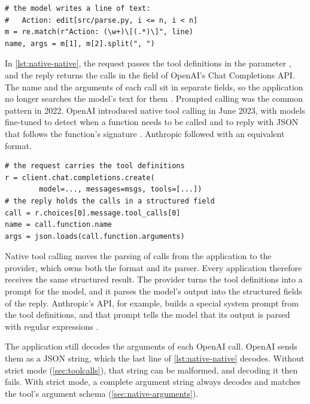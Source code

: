 \begin{lstlisting}[basicstyle=\ttfamily\footnotesize, caption={Illustrative code for prompted calling. The application finds the call in the model's text and splits the arguments at each comma followed by a space.}, label=lst:native-prompted]
# the model writes a line of text:
#   Action: edit[src/parse.py, i <= n, i < n]
m = re.match(r"Action: (\w+)\[(.*)\]", line)
name, args = m[1], m[2].split(", ")
\end{lstlisting}

In \cref{lst:native-native}, the request passes the tool definitions in the parameter
, and the reply returns the calls in the field  of OpenAI's Chat
Completions API. The name and the arguments of each call sit in separate fields, so the application
no longer searches the model's text for them \citep{openai-function-calling}. Prompted calling was
the common pattern in 2022. OpenAI introduced native tool calling in June 2023, with models fine-tuned to
detect when a function needs to be called and to reply with JSON that follows the function's
signature \citep{openai2023functioncalling}. Anthropic followed with an equivalent format.

\begin{lstlisting}[basicstyle=\ttfamily\footnotesize, caption={Illustrative code for native tool calling, abbreviated from OpenAI's Python client. The request carries the tool definitions, and the reply holds each call in a structured field.}, label=lst:native-native]
# the request carries the tool definitions
r = client.chat.completions.create(
        model=..., messages=msgs, tools=[...])
# the reply holds the calls in a structured field
call = r.choices[0].message.tool_calls[0]
name = call.function.name
args = json.loads(call.function.arguments)
\end{lstlisting}

Native tool calling moves the parsing of calls from the application to the provider, which owns both the
format and its parser. Every application therefore receives the same structured result. The
provider turns the tool definitions into a prompt for the model, and it parses the model's output
into the structured fields of the reply. Anthropic's API, for example, builds a special system
prompt from the tool definitions, and that prompt tells the model that its output is parsed with
regular expressions \citep{anthropic-define-tools}.

The application still decodes the arguments of each OpenAI call. OpenAI sends them as a JSON string,
which the last line of \cref{lst:native-native} decodes. Without strict mode (\cref{sec:toolcalls}),
that string can be malformed, and decoding it then fails. With strict mode, a complete argument
string always decodes and matches the tool's argument schema (\cref{sec:native-arguments}).

